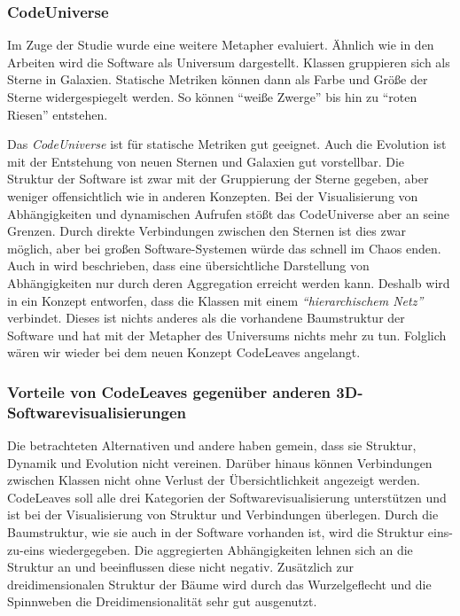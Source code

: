 \subsubsection*{CodeUniverse}

Im Zuge der Studie \cite{puetz2017softwarevisualisierung} wurde eine weitere Metapher evaluiert. Ähnlich wie in den Arbeiten \cite{graham2004solar, balzer2004software} wird die Software als Universum dargestellt. Klassen gruppieren sich als Sterne in Galaxien. Statische Metriken können dann als Farbe und Größe der Sterne widergespiegelt werden. So können "`weiße Zwerge"' bis hin zu "`roten Riesen"' entstehen.

Das \textit{CodeUniverse} ist für statische Metriken gut geeignet. Auch die Evolution ist mit der Entstehung von neuen Sternen und Galaxien gut vorstellbar. Die Struktur der Software ist zwar mit der Gruppierung der Sterne gegeben, aber weniger offensichtlich wie in anderen Konzepten. Bei der Visualisierung von Abhängigkeiten und dynamischen Aufrufen stößt das CodeUniverse aber an seine Grenzen. Durch direkte Verbindungen zwischen den Sternen ist dies zwar möglich, aber bei großen Software-Systemen würde das schnell im Chaos enden. Auch in \cite{balzer2004software} wird beschrieben, dass eine übersichtliche Darstellung von Abhängigkeiten nur durch deren Aggregation erreicht werden kann. Deshalb wird in \cite{balzer2004software} ein Konzept entworfen, dass die Klassen mit einem \emph{"`hierarchischem Netz"'} verbindet. Dieses ist nichts anderes als die vorhandene Baumstruktur der Software und hat mit der Metapher des Universums nichts mehr zu tun. Folglich wären wir wieder bei dem neuen Konzept CodeLeaves angelangt.


\subsubsection*{Vorteile von CodeLeaves gegenüber anderen 3D-Softwarevisualisierungen}
Die betrachteten Alternativen und andere haben gemein, dass sie Struktur, Dynamik und Evolution nicht vereinen. Darüber hinaus können Verbindungen zwischen Klassen nicht ohne Verlust der Übersichtlichkeit angezeigt werden. CodeLeaves soll alle drei Kategorien der Softwarevisualisierung unterstützen und ist bei der Visualisierung von Struktur und Verbindungen überlegen. Durch die Baumstruktur, wie sie auch in der Software vorhanden ist, wird die Struktur eins-zu-eins wiedergegeben. Die aggregierten Abhängigkeiten lehnen sich an die Struktur an und beeinflussen diese nicht negativ. Zusätzlich zur dreidimensionalen Struktur der Bäume wird durch das Wurzelgeflecht und die Spinnweben die Dreidimensionalität sehr gut ausgenutzt.

